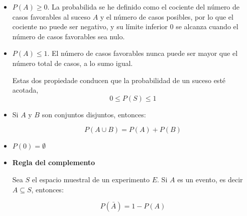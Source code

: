 \begin{tcolorbox}[colback=gray!5!white,colframe=gray!60!black,title=Axiomas de la probabilidad]

\begin{itemize}
\item $P(A) \geq 0$. La probabilida se he definido como el cociente del número
de casos favorables al suceso $A$ y el número de casos posibles, por lo que el
cociente no puede ser negativo, y su límite inferior 0 se alcanza cuando el
número de casos favorables sea nulo.

\item $P(A) \leq 1$. El número de casos favorables nunca puede ser mayor que el
número total de casos, a lo sumo igual.


Estas dos propiedade conducen  que la probabilidad de un suceso esté acotada, 
\begin{equation}
    0 \leq P(S) \leq 1
    \label{eq:acotadaProb}
\end{equation}

\item Si $A$ y $B$ son conjuntos disjuntos, entonces:

\begin{equation}
    P(A \cup B) = P(A) + P(B)
    \label{eq:probaAunionB}
\end{equation}

\item $P(0)=\emptyset$

\item \textbf{Regla del complemento}

Sea $S$ el espacio muestral de un experimento $E$. Si $A$ es un evento, es decir
$A \subseteq S$, entonces:

\begin{equation}
    P(\bar{A}) = 1 - P(A)
    \label{eq:complementRule}
\end{equation}

\end{itemize}
\end{tcolorbox}
